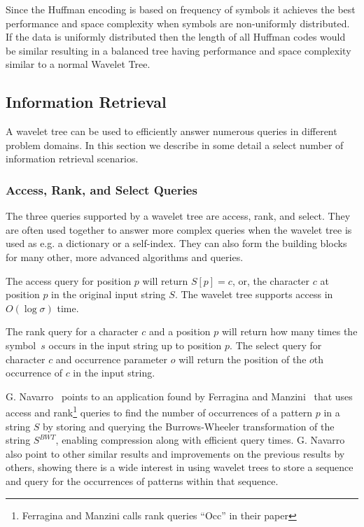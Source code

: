Since the Huffman encoding is based on frequency of symbols it achieves the best performance and space complexity when symbols are non-uniformly distributed.
If the data is uniformly distributed then the length of all Huffman codes would be similar resulting in a balanced tree having performance and space complexity similar to a normal Wavelet Tree.

\subsection{Information Retrieval}
A wavelet tree can be used to efficiently answer numerous queries in different problem domains.
In this section we describe in some detail a select number of information retrieval scenarios.

\subsubsection{Access, Rank, and Select Queries}
The three queries supported by a wavelet tree are access, rank, and select.
They are often used together to answer more complex queries when the wavelet tree is used as e.g. a dictionary or a self-index.
They can also form the building blocks for many other, more advanced algorithms and queries.

The access query for position $p$ will return $S[p] = c$, or, the character $c$ at position $p$ in the original input string $S$.
The wavelet tree supports access in $O(\log \sigma)$ time.

The rank query for a character $c$ and a position $p$ will return how many times the symbol~$s$ occurs in the input string up to position $p$.
The select query for character $c$ and occurrence parameter $o$ will return the position of the $o$th occurrence of $c$ in the input string.

G. Navarro~ points to an application found by Ferragina and Manzini~ that uses access and rank\footnote{Ferragina and Manzini calls rank queries “Occ” in their paper} queries to find the number of occurrences of a pattern $p$ in a string $S$ by storing and querying the Burrows-Wheeler transformation of the string $S^{BWT}$, enabling compression along with efficient query times.
G. Navarro~ also point to other similar results and improvements on the previous results by others, showing there is a wide interest in using wavelet trees to store a sequence and query for the occurrences of patterns within that sequence.


